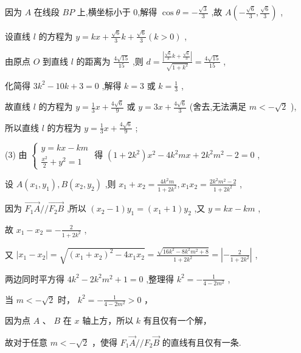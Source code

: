 \documentclass[10pt]{article}
\begin{document}
因为 \(A\) 在线段 \({BP}\) 上,横坐标小于 0,解得 \(\cos \theta  =  - \frac{\sqrt{3}}{3}\) ,故 \(A\left( {-\frac{\sqrt{6}}{3},\frac{\sqrt{6}}{3}}\right)\) ,

设直线 \(l\) 的方程为 \(y = {kx} + \frac{\sqrt{6}}{3}k + \frac{\sqrt{6}}{3}\left( {k > 0}\right)\) ,

由原点 \(O\) 到直线 \(l\) 的距离为 \(\frac{4\sqrt{15}}{15}\) ,则 \(d = \frac{\left| \frac{\sqrt{6}}{3}k + \frac{\sqrt{6}}{3}\right| }{\sqrt{1 + {k}^{2}}} = \frac{4\sqrt{15}}{15}\) ,

化简得 \(3{k}^{2} - {10k} + 3 = 0\) ,解得 \(k = 3\) 或 \(k = \frac{1}{3}\) ,

故直线 \(l\) 的方程为 \(y = \frac{1}{3}x + \frac{4\sqrt{6}}{9}\) 或 \(y = {3x} + \frac{4\sqrt{6}}{3}\) (舍去,无法满足 \(m <  - \sqrt{2}\) ),

所以直线 \(l\) 的方程为 \(y = \frac{1}{3}x + \frac{4\sqrt{6}}{9}\) ;

(3) 由 \(\left\{  \begin{array}{l} y = {kx} - {km} \\  \frac{{x}^{2}}{2} + {y}^{2} = 1 \end{array}\right.\) 得 \(\left( {1 + 2{k}^{2}}\right) {x}^{2} - 4{k}^{2}{mx} + 2{k}^{2}{m}^{2} - 2 = 0\) ,

设 \(A\left( {{x}_{1},{y}_{1}}\right) ,B\left( {{x}_{2},{y}_{2}}\right)\) ,则 \({x}_{1} + {x}_{2} = \frac{4{k}^{2}m}{1 + 2{k}^{2}},{x}_{1}{x}_{2} = \frac{2{k}^{2}{m}^{2} - 2}{1 + 2{k}^{2}}\) ,

因为 \(\overrightarrow{{F}_{1}A}//\overrightarrow{{F}_{2}B}\) ,所以 \(\left( {{x}_{2} - 1}\right) {y}_{1} = \left( {{x}_{1} + 1}\right) {y}_{2}\) ,又 \(y = {kx} - {km}\) ,

故 \({x}_{1} - {x}_{2} =  - \frac{2}{1 + 2{k}^{2}}\) ,

又 \(\left| {{x}_{1} - {x}_{2}}\right|  = \sqrt{{\left( {x}_{1} + {x}_{2}\right) }^{2} - 4{x}_{1}{x}_{2}} = \frac{\sqrt{{16}{k}^{2} - 8{k}^{2}{m}^{2} + 8}}{1 + 2{k}^{2}} = \left| {-\frac{2}{1 + 2{k}^{2}}}\right|\) ,

两边同时平方得 \(4{k}^{2} - 2{k}^{2}{m}^{2} + 1 = 0\) ,整理得 \({k}^{2} =  - \frac{1}{4 - 2{m}^{2}}\) ,

当 \(m <  - \sqrt{2}\) 时， \({k}^{2} =  - \frac{1}{4 - 2{m}^{2}} > 0\) ，

因为点 \(A\) 、 \(B\) 在 \(x\) 轴上方，所以 \(k\) 有且仅有一个解，

故对于任意 \(m <  - \sqrt{2}\) ，使得 \({F}_{1}\overrightarrow{A}//{F}_{2}\overrightarrow{B}\) 的直线有且仅有一条.
\end{document}
